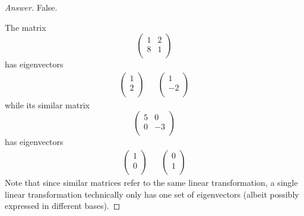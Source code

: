 \documentclass[../psets.tex]{subfiles}
\begin{document}
\begin{enumerate}[label={\textbf{1.\arabic*.}}]
\begin{enumerate}
\begin{proof}[Answer]
            False.\par
            The matrix
            \begin{equation*}
                \begin{pmatrix}
                    1 & 2\\
                    8 & 1\\
                \end{pmatrix}
            \end{equation*}
            has eigenvectors
            \begin{align*}
                \begin{pmatrix}
                    1\\
                    2\\
                \end{pmatrix}&&
                \begin{pmatrix}
                    1\\
                    -2\\
                \end{pmatrix}
            \end{align*}
            while its similar matrix
            \begin{equation*}
                \begin{pmatrix}
                    5 & 0\\
                    0 & -3\\
                \end{pmatrix}
            \end{equation*}
            has eigenvectors
            \begin{align*}
                \begin{pmatrix}
                    1\\
                    0\\
                \end{pmatrix}&&
                \begin{pmatrix}
                    0\\
                    1\\
                \end{pmatrix}
            \end{align*}
            Note that since similar matrices refer to the same linear transformation, a single linear transformation technically only has one set of eigenvectors (albeit possibly expressed in different bases).
        \end{proof}

\end{enumerate}
\end{enumerate}
\end{document}
